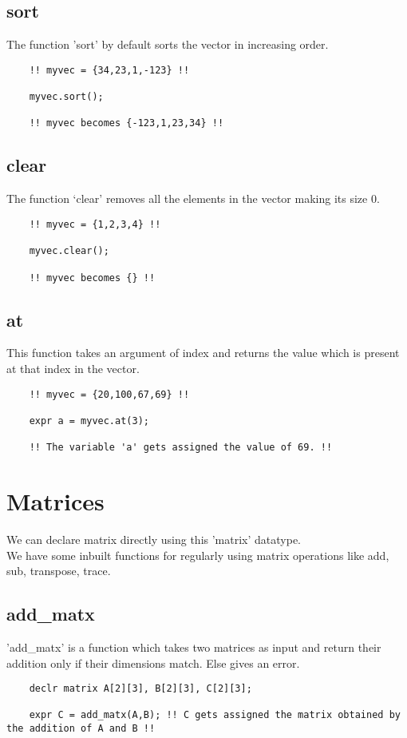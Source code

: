 \documentclass[journal, 18pt]{report}
\begin{document}
\subsection{sort}
The function 'sort' by default sorts the vector in increasing order.
\begin{lstlisting}
    !! myvec = {34,23,1,-123} !!

    myvec.sort();

    !! myvec becomes {-123,1,23,34} !!
\end{lstlisting}
\subsection{clear}
The function `clear' removes all the elements in the vector making its size 0.
\begin{lstlisting}
    !! myvec = {1,2,3,4} !!

    myvec.clear();

    !! myvec becomes {} !!
\end{lstlisting}
\subsection{at}
This function takes an argument of index and returns the value which is present at that index in the vector.
\begin{lstlisting}
    !! myvec = {20,100,67,69} !!

    expr a = myvec.at(3);

    !! The variable 'a' gets assigned the value of 69. !!
\end{lstlisting}
\section{Matrices}
We can declare matrix directly using this 'matrix' datatype.\\
We have some inbuilt functions for regularly using matrix operations like add, sub, transpose, trace.
\subsection{add\_matx}
'add\_matx' is a function which takes two matrices as input and return their addition only if their dimensions match. Else gives an error. \\
\begin{lstlisting}
    declr matrix A[2][3], B[2][3], C[2][3];

    expr C = add_matx(A,B); !! C gets assigned the matrix obtained by the addition of A and B !!
    
\end{lstlisting}
\end{document}
